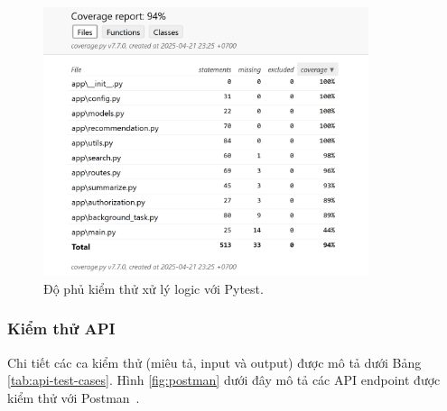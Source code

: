 \begin{figure}[H]
    \centering  
    \includegraphics[width=0.85\textwidth]{figures/c4/unittest.png}
    \caption{Độ phủ kiểm thử xử lý logic với Pytest.}
    \label{fig:pytest-testing}
\end{figure}


\subsubsection{Kiểm thử API}

Chi tiết các ca kiểm thử (miêu tả, input và output) được mô tả dưới Bảng \ref{tab:api-test-cases}. Hình \ref{fig:postman} dưới đây mô tả các API endpoint được kiểm thử với Postman~\cite{postman}.  

